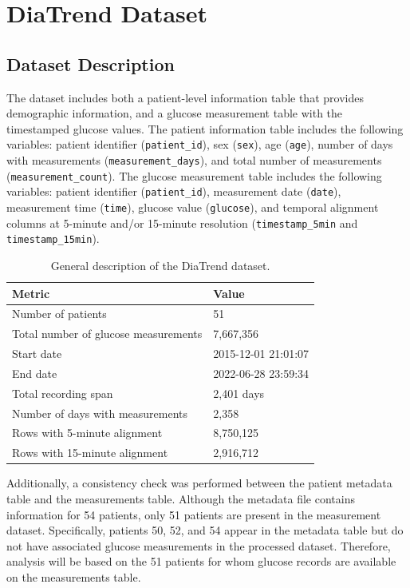 \section{DiaTrend Dataset}
\label{sec:eda_diatrend}

\subsection{Dataset Description}
\label{subsec:diatrend_dataset_description}

The dataset includes both a patient-level information table that provides demographic information, and a glucose measurement table with the timestamped glucose values. The patient information table includes the following variables: patient identifier (\verb|patient_id|), sex (\verb|sex|), age (\verb|age|), number of days with measurements (\verb|measurement_days|), and total number of measurements (\verb|measurement_count|). The glucose measurement table includes the following variables: patient identifier (\verb|patient_id|), measurement date (\verb|date|), measurement time (\verb|time|), glucose value (\verb|glucose|), and temporal alignment columns at 5-minute and/or 15-minute resolution (\verb|timestamp_5min| and \verb|timestamp_15min|).

\begin{table}[htbp]
    \centering
    \caption{General description of the DiaTrend dataset.}
    \label{tab:diatrend_general_description}
    \begin{tabular}{ll}
        \hline
        \textbf{Metric} & \textbf{Value} \\
        \hline
        Number of patients & 51 \\
        Total number of glucose measurements & 7,667,356 \\
        \hline
        Start date & 2015-12-01 21:01:07 \\
        End date & 2022-06-28 23:59:34 \\
        Total recording span & 2,401 days \\
        Number of days with measurements & 2,358 \\
        \hline
        Rows with 5-minute alignment & 8,750,125 \\
        Rows with 15-minute alignment & 2,916,712 \\
        \hline
    \end{tabular}
\end{table}

Additionally, a consistency check was performed between the patient metadata table and the measurements table. Although the metadata file contains information for 54 patients, only 51 patients are present in the measurement dataset. Specifically, patients 50, 52, and 54 appear in the metadata table but do not have associated glucose measurements in the processed dataset. Therefore, analysis will be based on the 51 patients for whom glucose records are available on the measurements table.

